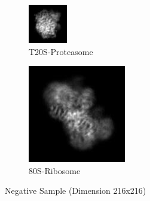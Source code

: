 \documentclass{report}
\begin{document}
\begin{figure}[H]
\centering
\begin{subfigure}{.5\textwidth}
\centering
\includegraphics[width=0.8\linewidth]{Emd_8647_proj1.jpg}
\captionsetup{justification=centering}
\caption{ T20S-Proteasome }
\end{subfigure} 
\begin{subfigure}{.48\textwidth}
\centering
\includegraphics[width=0.8\linewidth]{Emd_4138_proj_1.jpg}
\captionsetup{justification=centering}
\caption{ 80S-Ribosome }
\end{subfigure}
\caption{Negative Sample (Dimension 216x216)}
\label{fig:Negative-Projection}
\end{figure}
\end{document}
